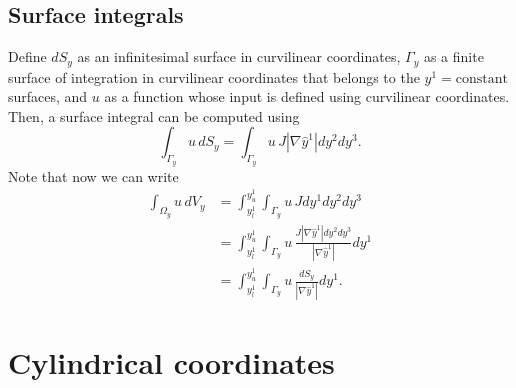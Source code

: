 \documentclass[11pt]{article}
\begin{document}
\subsection{Surface integrals}
Define $d S_y$ as an infinitesimal surface in curvilinear coordinates, $\Gamma_y$ as a finite surface of integration in curvilinear coordinates that belongs to the $y^1 = \text{constant}$ surfaces, and $u$ as a function whose input is defined using curvilinear coordinates. Then, a surface integral can be computed using 
\begin{equation}
    \int_{\Gamma_y} u \, d S_y = \int_{\Gamma_y} u \, J | \nabla \hat{y}^1| dy^2 dy^3.
\end{equation}
Note that now we can write
\begin{align}
\label{eq:int_from_vol_surf}
    \int_{\Omega_y} u \,dV_y &= \int_{y^1_l}^{y^1_u} \int_{\Gamma_y} u \, J dy^1 dy^2 dy^3 \nonumber \\
    &= \int_{y^1_l}^{y^1_u} \int_{\Gamma_y} u \, \frac{J | \nabla \hat{y}^1| dy^2 dy^3}{| \nabla \hat{y}^1 |} dy^1 \nonumber \\
    &= \int_{y^1_l}^{y^1_u} \int_{\Gamma_y} u \, \frac{dS_y}{|\nabla \hat{y}^1|} dy^1.
\end{align}

\section{Cylindrical coordinates}
\end{document}
